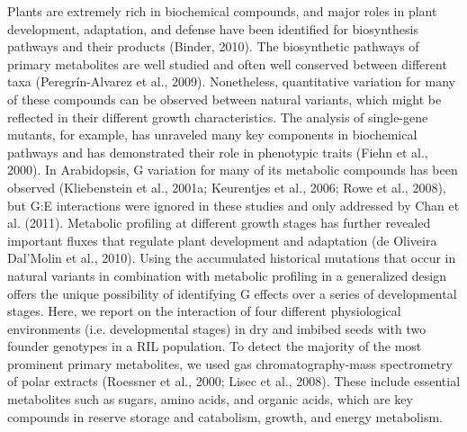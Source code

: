 Plants are extremely rich in biochemical compounds, and major roles in plant development, adaptation, 
and defense have been identified for biosynthesis pathways and their products (Binder, 2010). The 
biosynthetic pathways of primary metabolites are well studied and often well conserved between 
different taxa (Peregrín-Alvarez et al., 2009). Nonetheless, quantitative variation for many of 
these compounds can be observed between natural variants, which might be reflected in their different 
growth characteristics. The analysis of single-gene mutants, for example, has unraveled many key 
components in biochemical pathways and has demonstrated their role in phenotypic traits 
(Fiehn et al., 2000). In Arabidopsis, G variation for many of its metabolic compounds has been 
observed (Kliebenstein et al., 2001a; Keurentjes et al., 2006; Rowe et al., 2008), but G:E interactions 
were ignored in these studies and only addressed by Chan et al. (2011). Metabolic profiling at different 
growth stages has further revealed important fluxes that regulate plant development and adaptation 
(de Oliveira Dal'Molin et al., 2010). Using the accumulated historical mutations that occur in natural 
variants in combination with metabolic profiling in a generalized design offers the unique possibility 
of identifying G effects over a series of developmental stages. Here, we report on the interaction of 
four different physiological environments (i.e. developmental stages) in dry and imbibed seeds with 
two founder genotypes in a RIL population. To detect the majority of the most prominent primary 
metabolites, we used gas chromatography-mass spectrometry of polar extracts (Roessner et al., 2000;
Lisec et al., 2008). These include essential metabolites such as sugars, amino acids, and organic 
acids, which are key compounds in reserve storage and catabolism, growth, and energy metabolism.

